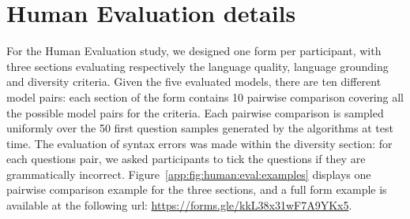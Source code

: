 \documentclass{article}
\begin{document}
\section{Human Evaluation details}
\label{app:human:eval}
For the Human Evaluation study, we designed one form per participant, with three sections evaluating respectively the language quality, language grounding and diversity criteria. Given the five evaluated models, there are ten different model pairs: each section of the form contains 10 pairwise comparison covering all the possible model pairs for the criteria. Each pairwise comparison is sampled uniformly over the 50 first question samples generated by the algorithms at test time. The evaluation of syntax errors was made within the diversity section: for each questions pair, we asked participants to tick the questions if they are grammatically incorrect. Figure~\ref{app:fig:human:eval:examples} displays one pairwise comparison example for the three sections, and a full form example is available at the following url: \url{https://forms.gle/kkL38x31wF7A9YKx5}. 
\end{document}

